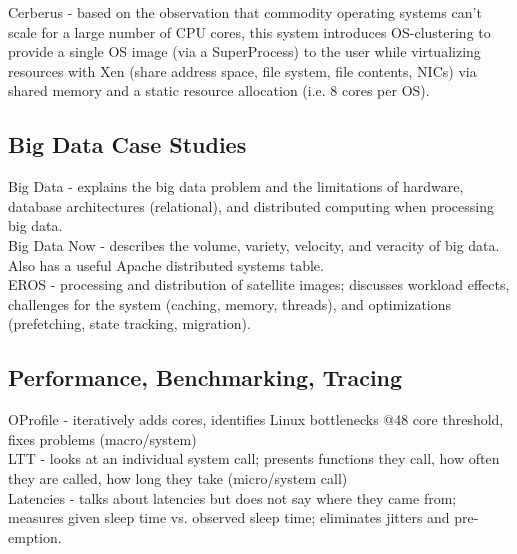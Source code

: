 \documentclass{article}
\begin{document}
\noindent\cite{song:eurosys2011-cerberus} Cerberus - based on the observation that commodity operating systems can't scale for a large number of CPU cores, this system introduces OS-clustering to provide a single OS image (via a SuperProcess) to the user while virtualizing resources with Xen (share address space, file system, file contents, NICs) via shared memory and a static resource allocation (i.e. 8 cores per OS).

\subsection{Big Data Case Studies}

\noindent\cite{jacobs:acm2009-big-data-article} Big Data - explains the big data problem and the limitations of hardware, database architectures (relational), and distributed computing when processing big data. \\

\noindent\cite{oreilly:2012-big-data-now} Big Data Now - describes the volume, variety, velocity, and veracity of big data. Also has a useful Apache distributed systems table. \\

\noindent\cite{zong:DISCS2012-satellite} EROS - processing and distribution of satellite images; discusses workload effects, challenges for the system (caching, memory, threads), and optimizations (prefetching, state tracking, migration). \\


\subsection{Performance, Benchmarking, Tracing}

\noindent\cite{boyd:osdi2010-scalability} OProfile - iteratively adds cores, identifies Linux bottlenecks @48 core threshold, fixes problems (macro/system)\\

\noindent\cite{sharma:lasci2005-ltt} LTT - looks at an individual system call; presents functions they call, how often they are called, how long they take (micro/system call)\\

\noindent\cite{abeni:rtas2002-linuxperf} Latencies - talks about latencies but does not say where they came from; measures given sleep time vs. observed sleep time; eliminates jitters and pre-emption.\\
\end{document}
